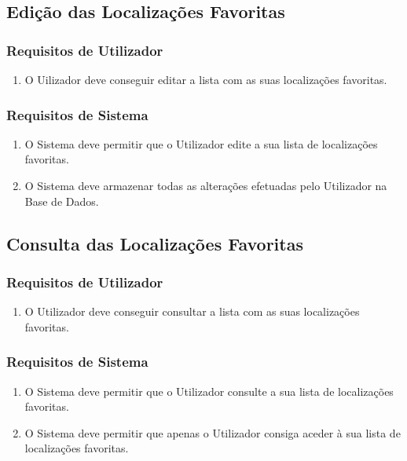 \documentclass[a4paper,12pt]{scrreprt}
\begin{document}
\subsection{Edição das Localizações Favoritas}

\subsubsection{Requisitos de Utilizador}

\begin{enumerate}
    \item O Uilizador deve conseguir editar a lista com as suas localizações favoritas.
\end{enumerate}

\subsubsection{Requisitos de Sistema }

\begin{enumerate}
    \item O Sistema deve permitir que o Utilizador edite a sua lista de localizações favoritas.
    \item O Sistema deve armazenar todas as alterações efetuadas pelo Utilizador na Base de Dados.
\end{enumerate}

\clearpage
\subsection{Consulta das Localizações Favoritas}

\subsubsection{Requisitos de Utilizador}

\begin{enumerate}
    \item O Utilizador deve conseguir consultar a lista com as suas localizações favoritas.
\end{enumerate}

\subsubsection{Requisitos de Sistema }

\begin{enumerate}
    \item O Sistema deve permitir que o Utilizador consulte a sua lista de localizações favoritas.
    \item O Sistema deve permitir que apenas o Utilizador consiga aceder à sua lista de localizações favoritas.
\end{enumerate}
\end{document}
